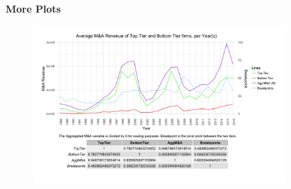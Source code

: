 \documentclass{article}
\begin{document}
{\large \textbf{More Plots} }

\begin{figure}[H]\centering
\includegraphics[width=0.85\textwidth]{../IndivTexOutput/MnADifferences.jpg}\end{figure}

\newpage
\end{document}
